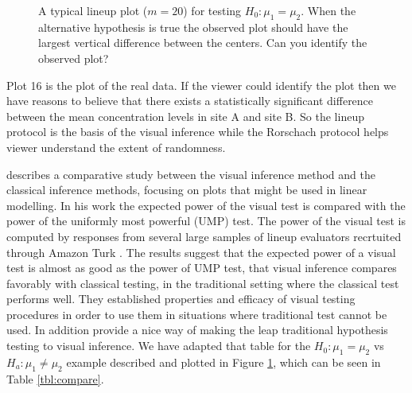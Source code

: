 \begin{figure}[hbtp]
   \centering
      \caption{A typical lineup plot ($m = 20$) for testing $H_0: \mu_1 =  \mu_2$. 
      When the alternative hypothesis is true the observed plot should have the largest vertical difference between the centers. Can you identify the observed plot?}
      \label{lineup}
\end{figure}


Plot 16 is the plot of the real data. If the viewer could identify the plot then we have reasons to believe that there exists a statistically significant difference between the mean concentration levels in site A and site B. So the lineup protocol is the basis of the visual inference while the Rorschach protocol helps viewer understand the extent of randomness. 

\cite{majumder:2011} describes a comparative study between the visual inference method and the classical inference methods, focusing on plots that might be used in linear modelling. In his work the expected power of the visual test is compared with the power of the uniformly most powerful (UMP) test. The power of the visual test is computed by responses from several large samples of lineup evaluators recrtuited through Amazon Turk \cite{turk}. The results suggest that the expected power of a visual test is almost as good as the power of UMP test, that visual inference compares favorably with classical testing, in the traditional setting where the classical test performs well. They established properties and efficacy of visual testing procedures in order to use them in situations where traditional test cannot be used. In addition \cite{majumder:2011} provide a nice way of making the leap traditional hypothesis testing to visual inference. We have adapted that table for the $H_0: \mu_1 =  \mu_2$ vs $H_a: \mu_1 \ne \mu_2$ example described and plotted in Figure \ref{lineup}, which can be seen in Table \ref{tbl:compare}.

